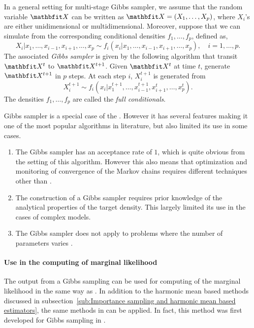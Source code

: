 In a general setting for multi-stage Gibbs sampler, we assume that the random
variable $\bfX$ can be written as $\bfX=(X_1,\dots,X_p)$, where $X_i$'s are
either unidimensional or multidimensional. Moreover, suppose that we can
simulate from the corresponding conditional densities $f_1,\dots,f_p$, defined
as,
\begin{equation}
  X_i|x_1,\dots,x_{i-1},x_{i+1},\dots,x_p
  \sim f_i(x_i|x_1,\dots,x_{i-1},x_{i+1},\dots,x_p),\quad i = 1,\dots,p.
\end{equation}
The associated \emph{Gibbs sampler} is given by the following algorithm that
transit $\bfX^t$ to $\bfX^{t+1}$. Given $\bfX^t$ at time $t$, generate
$\bfX^{t+1}$ in $p$ steps. At each step $i$, $X_i^{t+1}$ is generated from
\begin{equation}
  X_i^{t+1} \sim f_i(x_i|x_1^{t+1},\dots,x_{i-1}^{t+1},x_{i+1}^t,\dots,x_p^t).
\end{equation}
The densities $f_1,\dots,f_p$ are called the \emph{full conditionals}.

Gibbs sampler is a special case of the \mha
\parencite[see][chap.~10]{Robert2004}. However it has several features making
it one of the most popular \mcmc algorithms in literature, but also limited
its use in some cases.
\begin{enumerate}
  \item The Gibbs sampler has an acceptance rate of $1$, which is quite
    obvious from the setting of this algorithm. However this also means that
    optimization and monitoring of convergence of the Markov chains requires
    different techniques other than \mha.
  \item The construction of a Gibbs sampler requires prior knowledge of the
    analytical properties of the target density. This largely limited its use
    in the cases of complex models.
  \item The Gibbs sampler does not apply to problems where the number of
    parameters varies \parencite[see][chap.~10]{Robert2004}.
\end{enumerate}

\paragraph{Use in the computing of marginal likelihood} The output from a
Gibbs sampling can be used for computing of the marginal likelihood in the
same way as \mha. In addition to the harmonic mean based methods discussed in
subsection~\ref{sub:Importance sampling and harmonic mean based estimators},
the same methods in \textcite{Chib2001} can be applied. In fact, this method
was first developed for Gibbs sampling in \textcite{Chib1995}.

